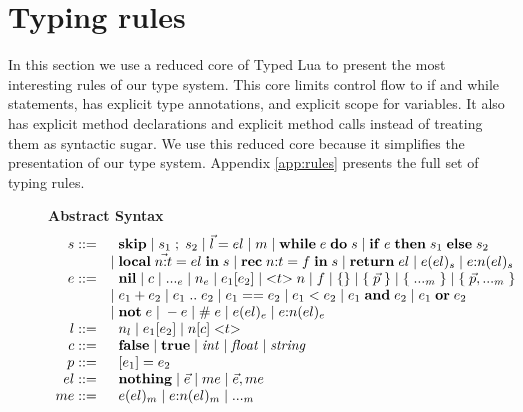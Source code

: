 \section{Typing rules}
\label{sec:rules}

In this section we use a reduced core of Typed Lua to present the
most interesting rules of our type system.
This core limits control flow to if and while statements,
has explicit type annotations, and explicit scope for variables.
It also has explicit method declarations and explicit method calls
instead of treating them as syntactic sugar.
We use this reduced core because it simplifies the presentation
of our type system.
Appendix \ref{app:rules} presents the full set of typing rules.

\begin{figure}[!ht]
\textbf{Abstract Syntax}\\
\dstart
$$
\begin{array}{rl}
s ::= & \;\; \mathbf{skip} \; | \;
s_{1} \; ; \; s_{2} \; | \;
\vec{l} = el \; | \;
m \; | \;
\mathbf{while} \; e \; \mathbf{do} \; s \; | \;
\mathbf{if} \; e \; \mathbf{then} \; s_{1} \; \mathbf{else} \; s_{2}\\
& | \; \mathbf{local} \; \vec{n{:}t} = el \; \mathbf{in} \; s \; | \;
\mathbf{rec} \; n{:}t = f \; \mathbf{in} \; s \; | \;
\mathbf{return} \; el \; | \;
e(el)_{s} \; | \;
e{:}n(el)_{s}\\
e ::= & \;\; \mathbf{nil} \; | \;
c \; | \;
{...}_{e} \; | \;
n_{e} \; | \;
e_{1}[e_{2}] \; | \;
{<}t{>} \; n \; | \;
f \; | \;
\{ \} \; | \;
\{ \; \vec{p} \; \} \; | \;
\{ \; {...}_{m} \; \} \; | \;
\{ \; \vec{p},{...}_{m} \; \}\\
& | \; e_{1} + e_{2} \; | \;
e_{1} \; {..} \; e_{2} \; | \;
e_{1} == e_{2} \; | \;
e_{1} < e_{2} \; | \;
e_{1} \; \mathbf{and} \; e_{2} \; | \;
e_{1} \; \mathbf{or} \; e_{2} \\
& | \; \mathbf{not} \; e \; | \;
- e \; | \;
\# \; e \; | \;
e(el)_{e} \; | \;
e{:}n(el)_{e}\\
l ::= & \;\; n_{l} \; | \;
e_{1}[e_{2}] \; | \;
n[c] \; {<}t{>}\\
c ::= & \;\; \mathbf{false} \; | \;
\mathbf{true} \; | \;
{\it int} \; | \;
{\it float} \; | \;
{\it string}\\
p ::= & \;\; [e_{1}] = e_{2}\\
el ::= & \;\; \mathbf{nothing} \; | \;
\vec{e} \; | \;
me \; | \;
\vec{e}, me\\
me ::= & \;\; e(el)_{m} \; | \;
e{:}n(el)_{m} \; | \;
{...}_{m}\\

\end{array}$$
\end{figure}
